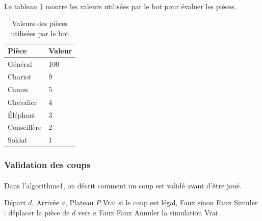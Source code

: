 \paragraph{} Le tableau \ref{tab:valeurs} montre les valeurs utilisées par le bot pour évaluer les pièces.

\begin{table}[H]
\centering
\begin{tabular} {|p{3.5cm}|p{2cm}|}
\hline
\textbf{Pièce} & \textbf{Valeur} \\
\hline
Général & 100 \\
\hline
Chariot & 9 \\
\hline
Canon & 5 \\
\hline
Chevalier & 4 \\
\hline
Éléphant & 3 \\
\hline
Conseillère & 2 \\
\hline
Soldat & 1 \\
\hline
\end{tabular}
\caption{Valeurs des pièces utilisées par le bot}
\label{tab:valeurs}
\end{table}

\subsubsection{Validation des coups}
\paragraph{} Dans l'algorithme1, on décrit comment un coup est validé avant d'être joué.

\begin{algorithm}[H]
\caption{Validation d'un coup avant de jouer}
\label{algo:valide}
\begin{algorithmic}
\REQUIRE Départ $d$, Arrivée $a$, Plateau $P$
\ENSURE Vrai si le coup est légal, Faux sinon
    \RETURN Faux
\ENDIF
\STATE Simuler : déplacer la pièce de $d$ vers $a$
    \RETURN Faux
\ENDIF
{}
    \RETURN Faux
\ENDIF
\STATE Annuler la simulation
\RETURN Vrai
\end{algorithmic}
\end{algorithm}

